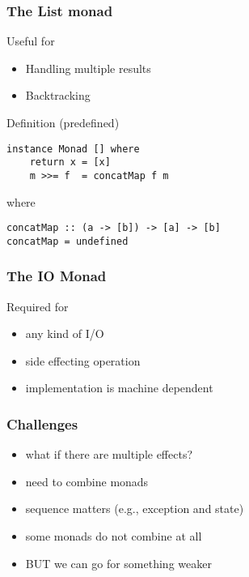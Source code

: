 \documentclass{beamer}
\begin{document}
\begin{frame}[fragile]
  \frametitle{The List monad}
  \begin{block}{Useful for}
                \begin{itemize}         
                        \item Handling multiple results
                        \item Backtracking
                \end{itemize}   
                \end{block}     
\pause
\begin{block}{Definition (predefined)}
\begin{verbatim}
instance Monad [] where
    return x = [x]
    m >>= f  = concatMap f m
\end{verbatim}  
\end{block}
where 
\begin{verbatim}
concatMap :: (a -> [b]) -> [a] -> [b]
concatMap = undefined
\end{verbatim}
\end{frame}             

\begin{frame}[fragile]
  \frametitle{The IO Monad}
  \begin{block}{Required for}
  \begin{itemize}
        \item any kind of I/O
        \item side effecting operation
        \item implementation is machine dependent
  \end{itemize}
  \end{block}
\end{frame}

\begin{frame}
  \frametitle{Challenges}
  \begin{itemize}[<+->]
  \item what if there are multiple effects?
  \item need to combine monads
  \item sequence matters (e.g., exception and state)
  \item some monads do not combine at all
  \item BUT we can go for something weaker
  \end{itemize}
  
\end{frame}
\end{document}
